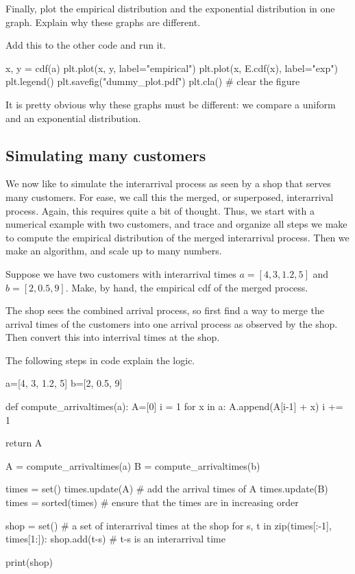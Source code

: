 \documentclass{scrartcl}
\begin{document}
\begin{exercise}
  Finally, plot the empirical distribution and the exponential distribution in one graph. Explain why these graphs are different.
\begin{solution}
Add this to the other code and run it. 
\begin{pyverbatim}
x, y = cdf(a)
plt.plot(x, y,  label="empirical")
plt.plot(x, E.cdf(x),  label="exp")
plt.legend()
plt.savefig("dummy_plot.pdf")
plt.cla() # clear the figure
\end{pyverbatim}

It is pretty obvious why these graphs must be different: we compare a uniform and an exponential distribution. 
\end{solution}
\end{exercise}


\subsection{Simulating many customers}
\label{sec:simul-many-cust}

We now like to simulate the interarrival process as seen by a shop that serves many customers. For ease, we call this the merged, or superposed, interarrival process. Again, this requires quite a bit of thought. Thus, we start with a numerical example with two customers, and trace and organize all steps we make to compute the empirical distribution of the merged interarrival process. Then we make an algorithm, and scale up to many numbers. 

\begin{exercise}
  Suppose we have two customers with interarrival times $a=[4, 3, 1.2, 5]$ and $b=[2, 0.5, 9]$. Make, by hand, the empirical cdf of the merged process.
  \begin{hint}
  The shop sees the combined arrival process, so  first find a way to merge the arrival times of the customers into one arrival process as observed by the shop. Then  convert this into interrival times at the shop. 
  \end{hint}
  \begin{solution}
    The following steps in code explain the logic.
    \begin{pyblock}
a=[4, 3, 1.2, 5]
b=[2, 0.5, 9]

def compute_arrivaltimes(a):
    A=[0]
    i = 1
    for x in a:
        A.append(A[i-1] + x)
        i += 1

    return A

A = compute_arrivaltimes(a)
B = compute_arrivaltimes(b)


times = set()
times.update(A) # add the arrival times of A 
times.update(B)
times = sorted(times) # ensure that the times are in increasing order

shop = set() # a set of interarrival times at the shop
for s, t in zip(times[:-1], times[1:]):
    shop.add(t-s) # t-s is an interarrival time

print(shop)
    \end{pyblock}
  \end{solution}
\end{exercise}
\end{document}
